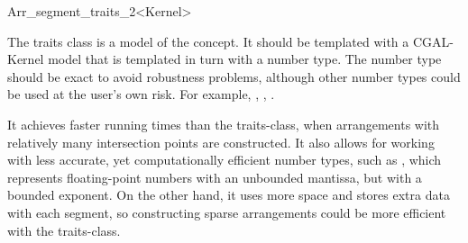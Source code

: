 \ccRefPageBegin
\begin{ccRefClass}{Arr_segment_traits_2<Kernel>}
    
\ccDefinition 
  The traits class  is a model of the
   concept. It should be templated with a CGAL-Kernel
  model that is templated in turn with a number type. The number type should be
  exact to avoid robustness problems, although other number types could be used
  at the user's own risk. For example, ,
  , .

  It achieves faster running times than the
   traits-class, when arrangements
  with relatively many intersection points are constructed. It also allows for
  working with less accurate, yet computationally efficient number types, such
  as , which represents floating-point numbers with
  an unbounded mantissa, but with a bounded exponent. On the other hand, it
  uses more space and stores extra data with each segment, so constructing
  sparse arrangements could be more efficient with the
   traits-class.

 
\ccIsModel

\end{ccRefClass}
\ccRefPageEnd
